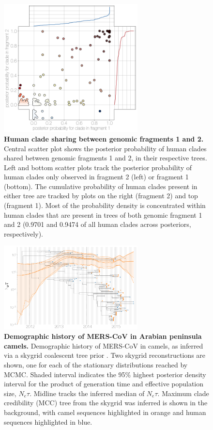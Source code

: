 \documentclass[11pt,oneside,letterpaper]{article}
\begin{document}
\begin{figure}[h]
\centering
	\includegraphics[width=0.65\textwidth]{figures/mers_flower.png}
	\caption{\textbf{Human clade sharing between genomic fragments 1 and 2.}
Central scatter plot shows the posterior probability of human clades shared between genomic fragments 1 and 2, in their respective trees.
Left and bottom scatter plots track the posterior probability of human clades only observed in fragment 2 (left) or fragment 1 (bottom).
The cumulative probability of human clades present in either tree are tracked by plots on the right (fragment 2) and top (fragment 1).
Most of the probability density is concentrated within human clades that are present in trees of both genomic fragment 1 and 2 (0.9701 and 0.9474 of all human clades across posteriors, respectively).
	}
	\label{flower}
\end{figure}

\begin{figure}[h]
\centering
	\includegraphics[width=0.65\textwidth]{figures/mers_skygrid.png}
	\caption{\textbf{Demographic history of MERS-CoV in Arabian peninsula camels.}
Demographic history of MERS-CoV in camels, as inferred via a skygrid coalescent tree prior \citep{gill_2013}.
Two skygrid reconstructions are shown, one for each of the stationary distributions reached by MCMC.
Shaded interval indicates the 95\% highest posterior density interval for the product of generation time and effective population size, $N_{e}\tau$.
Midline tracks the inferred median of $N_{e}\tau$.
Maximum clade credibility (MCC) tree from the skygrid was inferred is shown in the background, with camel sequences highlighted in orange and human sequences highlighted in blue.
	}
	\label{skygrid}
\end{figure}
\end{document}
